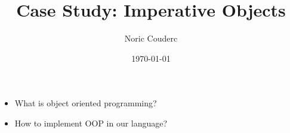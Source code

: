 \documentclass[presentation]{beamer}
\author{Noric Couderc}
\date{\today}
\title{Case Study: Imperative Objects}
\begin{document}
\maketitle

\begin{frame}
  \begin{itemize}
  \item What is object oriented programming?
  \item How to implement OOP in our language?
  \end{itemize}

\end{frame}

\begin{frame}

\end{frame}
\end{document}
